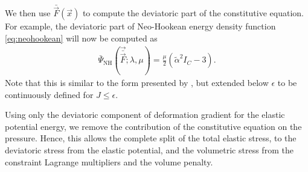 We then use $\bar{\vec{F}}(\vec{x})$ to compute the deviatoric part of the constitutive equation. For example, 
the deviatoric part of Neo-Hookean energy density function \eqref{eq:neohookean} will now be computed as
\begin{align}
\bar{\Psi}_{\text{NH}}(\vec{\bar{\vec{F}}}; \lambda, \mu) = \frac{\mu}{2}(\tilde{\alpha}^2 I_C - 3).
\label{eq:deviatoric_neohookean}
\end{align}
Note that this is similar to the form presented by \cite{Rivlin:1948}, but extended below 
$\epsilon$ to be continuously defined for $J \leq \epsilon$. 

Using only the deviatoric component of deformation gradient for the elastic potential energy, we remove the contribution of the constitutive equation on the pressure. Hence, this allows the complete split of the total elastic stress, to the deviatoric stress from the elastic potential, and the volumetric stress from the constraint Lagrange multipliers and the volume penalty.